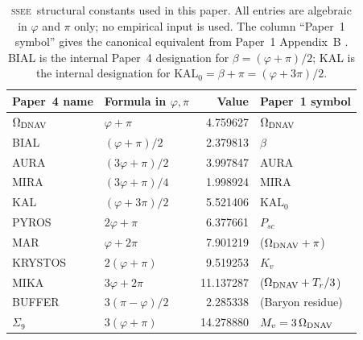 \documentclass[12pt,a4paper]{article}
\newcommand{\SSEE}{\ifmmode\mathrm{SSEE}\else\textsc{ssee}\fi}
\begin{document}
\begin{table}[ht]
\centering
\caption{\SSEE\ structural constants used in this paper. All entries are algebraic
  in $\varphi$ and $\pi$ only; no empirical input is used.
  The column ``Paper~1 symbol'' gives the canonical equivalent from
  Paper~1 Appendix~B \citep{AlmeidaSSEE2026paper1}.
  BIAL is the internal Paper~4 designation for $\beta = (\varphi+\pi)/2$;
  KAL is the internal designation for $\mathrm{KAL}_0 = \beta+\pi = (\varphi+3\pi)/2$.}
\label{tab:constants}
\begin{tabular}{ll r l}
\toprule
Paper~4 name & Formula in $\varphi,\pi$ & Value & Paper~1 symbol \\
\midrule
$\Omega_{\rm DNAV}$ & $\varphi+\pi$           & 4.759627  & $\Omega_{\rm DNAV}$ \\
BIAL  & $(\varphi+\pi)/2$                       & 2.379813  & $\beta$ \\
AURA  & $(3\varphi+\pi)/2$                      & 3.997847  & AURA \\
MIRA  & $(3\varphi+\pi)/4$                      & 1.998924  & MIRA \\
KAL   & $(\varphi+3\pi)/2$                      & 5.521406  & $\mathrm{KAL}_0$ \\
PYROS & $2\varphi+\pi$                           & 6.377661  & $P_{sc}$ \\
MAR   & $\varphi+2\pi$                          & 7.901219  & ($\Omega_{\rm DNAV}+\pi$) \\
KRYSTOS & $2(\varphi+\pi)$                      & 9.519253  & $K_v$ \\
MIKA  & $3\varphi+2\pi$                         & 11.137287 & ($\Omega_{\rm DNAV}+T_r/3$) \\
BUFFER & $3(\pi-\varphi)/2$                     & 2.285338  & (Baryon residue) \\
$\Sigma_9$ & $3(\varphi+\pi)$                   & 14.278880 & $M_v = 3\,\Omega_{\rm DNAV}$ \\
\bottomrule
\end{tabular}
\end{table}
\end{document}
